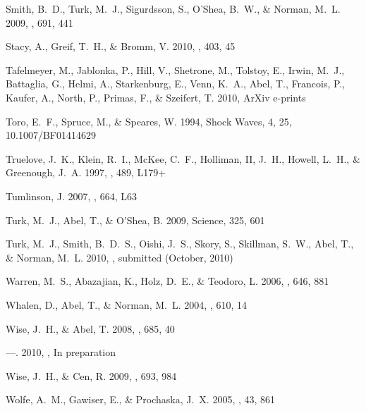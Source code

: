\documentclass[12pt,preprint]{aastex}
\begin{document}
\begin{thebibliography}{50}
{Smith}, B.~D., {Turk}, M.~J., {Sigurdsson}, S., {O'Shea}, B.~W., \& {Norman},
  M.~L. 2009, \apj, 691, 441

{Stacy}, A., {Greif}, T.~H., \& {Bromm}, V. 2010, \mnras, 403, 45

{Tafelmeyer}, M., {Jablonka}, P., {Hill}, V., {Shetrone}, M., {Tolstoy}, E.,
  {Irwin}, M.~J., {Battaglia}, G., {Helmi}, A., {Starkenburg}, E., {Venn},
  K.~A., {Abel}, T., {Francois}, P., {Kaufer}, A., {North}, P., {Primas}, F.,
  \& {Szeifert}, T. 2010, ArXiv e-prints

Toro, E.~F., Spruce, M., \& Speares, W. 1994, Shock Waves, 4, 25,
  10.1007/BF01414629

{Truelove}, J.~K., {Klein}, R.~I., {McKee}, C.~F., {Holliman}, II, J.~H.,
  {Howell}, L.~H., \& {Greenough}, J.~A. 1997, \apjl, 489, L179+

{Tumlinson}, J. 2007, \apjl, 664, L63

{Turk}, M.~J., {Abel}, T., \& {O'Shea}, B. 2009, Science, 325, 601

{Turk}, M.~J., {Smith}, B.~D.~S., {Oishi}, J.~S., {Skory}, S., {Skillman},
  S.~W., {Abel}, T., \& {Norman}, M.~L. 2010, \apjs, submitted (October, 2010)

{Warren}, M.~S., {Abazajian}, K., {Holz}, D.~E., \& {Teodoro}, L. 2006, \apj,
  646, 881

{Whalen}, D., {Abel}, T., \& {Norman}, M.~L. 2004, \apj, 610, 14

{Wise}, J.~H., \& {Abel}, T. 2008, \apj, 685, 40

---. 2010, \apjs, In preparation

{Wise}, J.~H., \& {Cen}, R. 2009, \apj, 693, 984

{Wolfe}, A.~M., {Gawiser}, E., \& {Prochaska}, J.~X. 2005, \araa, 43, 861

\end{thebibliography}
\end{document}
